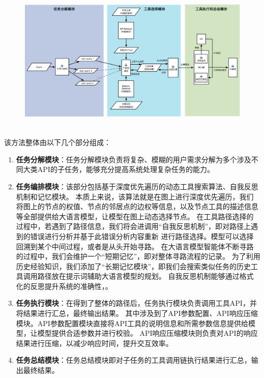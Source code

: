 \begin{figure}[!htp]
  \vspace{1em}
  \centering
  \setlength{\abovecaptionskip}{10pt} %
  \includegraphics[height=7cm]{../assets/ch4-整体框架图-3.pdf}
  \label{fig:ch4-framework}
\end{figure}

该方法整体由以下几个部分组成：

\begin{enumerate}
  \item \textbf{任务分解模块}：任务分解模块负责将复杂、模糊的用户需求分解为多个涉及不同大类API的子任务，能够充分提高系统处理复杂任务的能力。
  \item \textbf{任务编排模块}：该部分包括基于深度优先遍历的动态工具搜索算法、自我反思机制和记忆模块。
  本质上来说，该算法就是在图上进行深度优先遍历，我们将图上的节点的权值、节点的邻居点的边权等信息，以及节点工具的描述信息等全部提供给大语言模型，让模型在图上动态选择节点。
  在工具路径选择的过程中，若遇到了路径信息，我们将会进调用“自我反思机制”，即对路径上遇到的错误进行分析并基于此错误分析内容重新
  进行路径选择。模型可以选择回溯到某个中间过程，或者是从头开始寻路。
  在大语言模型智能体不断寻路的过程中，我们会维护一个“短期记忆”，即对整体寻路流程的记录。
  为了利用历史经验知识，我们添加了“长期记忆模块”，即我们会搜索类似任务的历史工具调用路径放在提示词辅助大语言模型的规划。
  自我反思机制能够通过格式化的反思提升系统的准确性，。
  \item \textbf{任务执行模块}：在得到了整体的路径后，任务执行模块负责调用工具API，并将结果进行汇总，最终输出结果。
  其中涉及到了API参数配置、API响应压缩模块。API参数配置模块直接将API工具的说明信息和所需参数信息提供给模型，让模型提供合适参数并进行校验。
  API响应压缩模块则负责对API的响应结果进行压缩，以减少响应时间，提升交互效率。
  \item \textbf{任务总结模块}：任务总结模块即对子任务的工具调用链执行结果进行汇总，输出最终结果。
\end{enumerate}

